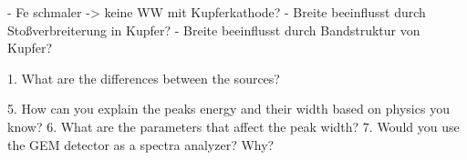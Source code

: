 - Fe schmaler -> keine WW mit Kupferkathode? 
- Breite beeinflusst durch Stoßverbreiterung in Kupfer?
- Breite beeinflusst durch Bandstruktur von Kupfer? 

1. What are the differences between the sources?

5. How can you explain the peaks energy and their width based on physics you know?
6. What are the parameters that affect the peak width?
7. Would you use the GEM detector as a spectra analyzer? Why? 